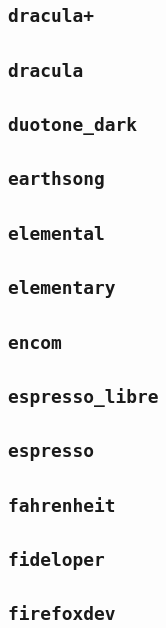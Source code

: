 \subsection{\texttt{dracula+}}
\newpage
\subsection{\texttt{dracula}}
\newpage
\subsection{\texttt{duotone\_dark}}
\newpage
\subsection{\texttt{earthsong}}
\newpage
\subsection{\texttt{elemental}}
\newpage
\subsection{\texttt{elementary}}
\newpage
\subsection{\texttt{encom}}
\newpage
\subsection{\texttt{espresso\_libre}}
\newpage
\subsection{\texttt{espresso}}
\newpage
\subsection{\texttt{fahrenheit}}
\newpage
\subsection{\texttt{fideloper}}
\newpage
\subsection{\texttt{firefoxdev}}
\newpage
